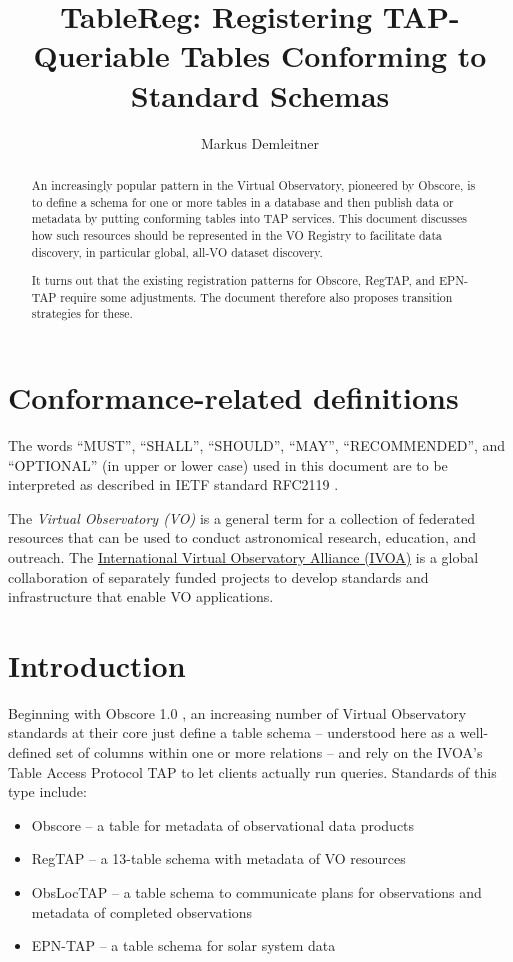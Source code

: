 \documentclass[11pt,a4paper]{ivoa}
\title{TableReg: Registering TAP-Queriable Tables Conforming to Standard
Schemas}
\author[http://www.ivoa.net/cgi-bin/twiki/bin/view/IVOA/MarkusDemleitner]{Markus Demleitner}
\begin{document}
\begin{abstract}
An increasingly popular pattern in the Virtual Observatory, pioneered
by Obscore, is to define a schema for one or more tables in a database
and then publish data or metadata by putting conforming tables into
TAP services.  This document discusses how such resources
should be represented in the VO Registry to facilitate data discovery,
in particular global, all-VO dataset discovery.

It turns out that the existing registration patterns for Obscore,
RegTAP, and EPN-TAP require some adjustments.  The document therefore
also proposes transition strategies for these.
\end{abstract}


\section*{Conformance-related definitions}

The words ``MUST'', ``SHALL'', ``SHOULD'', ``MAY'', ``RECOMMENDED'', and
``OPTIONAL'' (in upper or lower case) used in this document are to be
interpreted as described in IETF standard RFC2119 \citep{std:RFC2119}.

The \emph{Virtual Observatory (VO)} is a
general term for a collection of federated resources that can be used
to conduct astronomical research, education, and outreach.
The \href{https://www.ivoa.net}{International
Virtual Observatory Alliance (IVOA)} is a global
collaboration of separately funded projects to develop standards and
infrastructure that enable VO applications.


\section{Introduction}

Beginning with Obscore 1.0 \citep{2011ivoa.spec.1028T}, an increasing
number of Virtual Observatory standards at their core just define a
table schema -- understood here as a well-defined set of columns within
one or more relations -- and rely on the IVOA's Table Access Protocol
TAP \citep{2019ivoa.spec.0927D} to
let clients actually run queries.  Standards of this type include:

\begin{itemize}
\item Obscore \citep{2017ivoa.spec.0509L} -- a table for metadata of
observational data products
\item RegTAP \citep{2019ivoa.spec.1011D} -- a 13-table schema with
metadata of VO resources
\item ObsLocTAP \citep{2021ivoa.spec.0724S} -- a table schema to
communicate plans for observations and metadata of completed
observations
\item EPN-TAP \citep{2022ivoa.spec.0822E} -- a table schema for solar
system data
\end{itemize}
\end{document}
